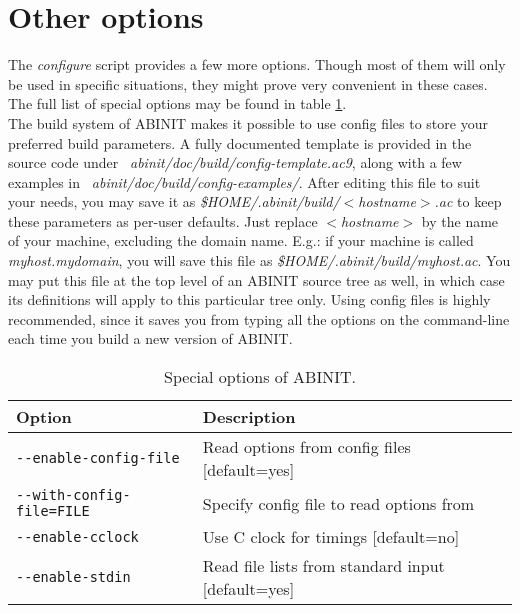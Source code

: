 \section{Other options}

The \textit{configure} script provides a few more options. Though
most of them will only be used in specific situations, they might
prove very convenient in these cases. The full list of special options
may be found in table \ref{tab:opt-special}. \\


The build system of ABINIT makes it possible to use config files to
store your preferred build parameters. A fully documented template
is provided in the source code under \textit{~abinit/doc/build/config-template.ac9},
along with a few examples in \textit{~abinit/doc/build/config-examples/}.
After editing this file to suit your needs, you may save it as \textit{\$HOME/.abinit/build/$<$hostname$>$.ac}
to keep these parameters as per-user defaults. Just replace \textit{$<$hostname$>$}
by the name of your machine, excluding the domain name. E.g.: if your
machine is called \textit{myhost.mydomain}, you will save this file
as \textit{\$HOME/.abinit/build/myhost.ac}. You may put this file
at the top level of an ABINIT source tree as well, in which case its
definitions will apply to this particular tree only. Using config
files is highly recommended, since it saves you from typing all the
options on the command-line each time you build a new version of ABINIT.
\\


%
\begin{table}
\begin{centering}
\begin{tabular}{|l|l|}
\hline 
\textbf{Option}  & \textbf{Description} \tabularnewline
\hline 
\texttt{-{-}enable-config-file}  & Read options from config files {[}default=yes{]} \tabularnewline
\texttt{-{-}with-config-file=FILE}  & Specify config file to read options from \tabularnewline
\hline 
\texttt{-{-}enable-cclock}  & Use C clock for timings {[}default=no{]} \tabularnewline
\hline 
\texttt{-{-}enable-stdin}  & Read file lists from standard input {[}default=yes{]} \tabularnewline
\hline
\end{tabular}
\par\end{centering}

\caption{Special options of ABINIT.}


\label{tab:opt-special} 
\end{table}

